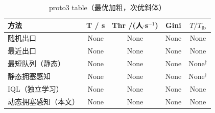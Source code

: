 \begin{table}[H]
  \centering
  \caption{proto3 table（最优加粗，次优斜体）}
  \label{tab:proto3_table}
  \begin{tabular}{lcccc}
    \toprule
    方法 & T / s & Thr /(人$\cdot$s$^{-1}$) & Gini & $T/T_{\mathrm{lb}}$ \\
    \midrule
    随机出口 & None & None & None & None \\
    最近出口 & None & None & None & None \\
    最短队列（静态） & None & None & None & None$^{†}$ \\
    静态拥塞感知 & None & None & None & None$^{†}$ \\
    IQL（独立学习） & None & None & None & None \\
    动态拥塞感知（本文） & None & None & None & None \\
    \bottomrule
  \end{tabular}
\end{table}
